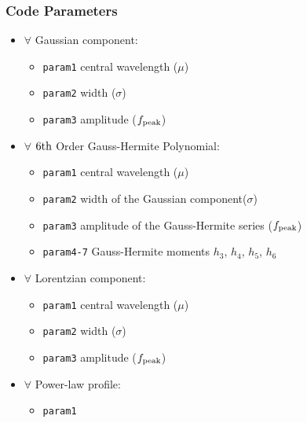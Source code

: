 \documentclass[12pt,letterpaper]{article}
\begin{document}
\subsubsection*{Code Parameters}
\begin{itemize}
    \item $\forall$ Gaussian component:
	\begin{itemize}
	    \item{\tt param1} central wavelength ($\mu$)
	    \item{\tt param2} width ($\sigma$)
	    \item{\tt param3} amplitude ($f_{\rm peak}$)	    
	\end{itemize}

    \item $\forall$ $6{\rm th}$ Order Gauss-Hermite Polynomial:
	\begin{itemize}
	    \item{\tt param1} central wavelength ($\mu$)
	    \item{\tt param2} width of the Gaussian component($\sigma$)
	    \item{\tt param3} amplitude of the Gauss-Hermite series ($f_{\rm peak}$)
	    \item{\tt param4-7} Gauss-Hermite moments $h_3$, $h_4$, $h_5$, $h_6$
	\end{itemize}   

    \item $\forall$ Lorentzian component:
	\begin{itemize}
	    \item{\tt param1} central wavelength ($\mu$)
	    \item{\tt param2} width ($\sigma$)
	    \item{\tt param3} amplitude ($f_{\rm peak}$)	    
	\end{itemize}   

    \item $\forall$ Power-law profile:
	\begin{itemize}
	    \item{\tt param1}     
	\end{itemize}   

\end{itemize}
\end{document}
